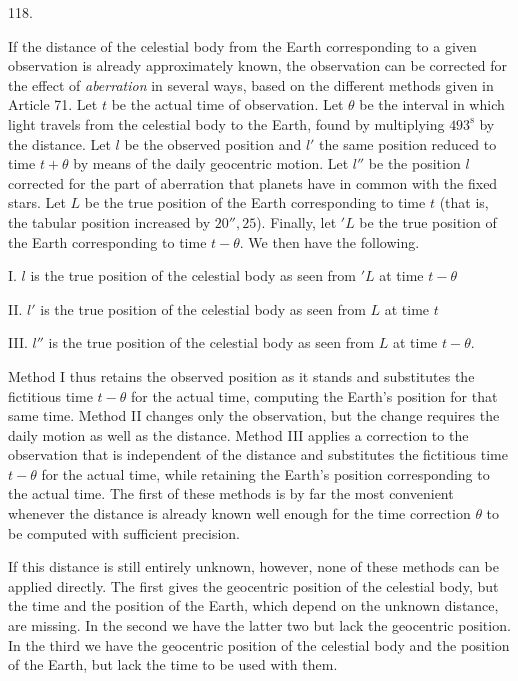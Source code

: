 \par\medskip
\begin{center}\hypertarget{native-164-article118}{}118.\end{center}
If the distance of the celestial body from the Earth corresponding to a given observation is already approximately known, the observation can be corrected for the effect of \emph{aberration} in several ways, based on the different methods given in Article 71. Let $t$ be the actual time of observation. Let $\theta$ be the interval in which light travels from the celestial body to the Earth, found by multiplying $493^{\mathrm{s}}$ by the distance. Let $l$ be the observed position and $l'$ the same position reduced to time $t+\theta$ by means of the daily geocentric motion. Let $l''$ be the position $l$ corrected for the part of aberration that planets have in common with the fixed stars. Let $L$ be the true position of the Earth corresponding to time $t$ (that is, the tabular position increased by $20''{,}25$). Finally, let ${}'L$ be the true position of the Earth corresponding to time $t-\theta$. We then have the following.
\par I. $l$ is the true position of the celestial body as seen from ${}'L$ at time $t-\theta$
\par II. $l'$ is the true position of the celestial body as seen from $L$ at time $t$
\par III. $l''$ is the true position of the celestial body as seen from $L$ at time $t-\theta$.
\par\noindent Method I thus retains the observed position as it stands and substitutes the fictitious time $t-\theta$ for the actual time, computing the Earth's position for that same time. Method II changes only the observation, but the change requires the daily motion as well as the distance. Method III applies a correction to the observation that is independent of the distance and substitutes the fictitious time $t-\theta$ for the actual time, while retaining the Earth's position corresponding to the actual time. The first of these methods is by far the most convenient whenever the distance is already known well enough for the time correction $\theta$ to be computed with sufficient precision.

If this distance is still entirely unknown, however, none of these methods can be applied directly. The first gives the geocentric position of the celestial body, but the time and the position of the Earth, which depend on the unknown distance, are missing. In the second we have the latter two but lack the geocentric position. In the third we have the geocentric position of the celestial body and the position of the Earth, but lack the time to be used with them.


